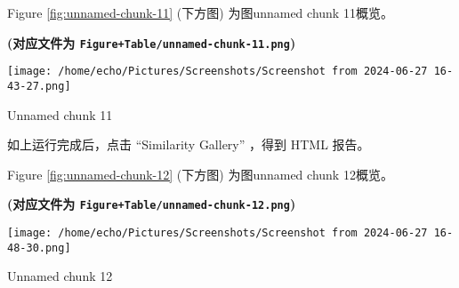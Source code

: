 \documentclass[
]{article}
\begin{document}
Figure \ref{fig:unnamed-chunk-11} (下方图) 为图unnamed chunk 11概览。

\textbf{(对应文件为 \texttt{Figure+Table/unnamed-chunk-11.png})}

\def\@captype{figure}
\begin{center}
\texttt{[image: /home/echo/Pictures/Screenshots/Screenshot from 2024-06-27 16-43-27.png]}
\caption{Unnamed chunk 11}\label{fig:unnamed-chunk-11}
\end{center}

\begin{center}\vspace{1.5cm}\end{center}

如上运行完成后，点击 ``Similarity Gallery'' ，得到 HTML 报告。

\begin{center}\vspace{1.5cm}\end{center}

Figure \ref{fig:unnamed-chunk-12} (下方图) 为图unnamed chunk 12概览。

\textbf{(对应文件为 \texttt{Figure+Table/unnamed-chunk-12.png})}

\def\@captype{figure}
\begin{center}
\texttt{[image: /home/echo/Pictures/Screenshots/Screenshot from 2024-06-27 16-48-30.png]}
\caption{Unnamed chunk 12}\label{fig:unnamed-chunk-12}
\end{center}

\begin{center}\vspace{1.5cm}\end{center}
\end{document}
